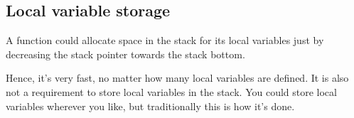\subsection{Local variable storage}

A function could allocate space in the stack for its local variables just by decreasing 
the \gls{stack pointer} towards the stack bottom.


Hence, it's very fast, no matter how many local variables are defined.
It is also not a requirement to store local variables in the stack.
You could store local variables wherever you like, 
but traditionally this is how it's done.

